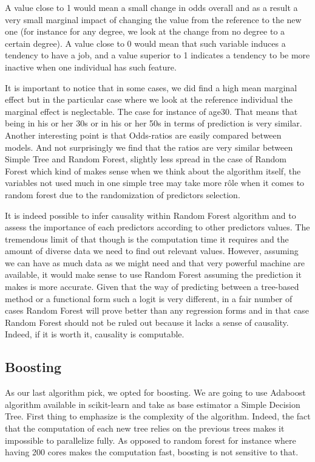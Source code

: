 
A value close to 1 would mean a small change in odds overall and as a result a very small marginal impact of changing the value from the reference to the new one (for instance for any degree, we look at the change from no degree to a certain degree). A value close to 0 would mean that such variable induces a tendency to have a job, and a value superior to 1 indicates a tendency to be more inactive when one individual has such feature.



It is important to notice that in some cases, we did find a high mean marginal effect but in the particular case where we look at the reference individual the marginal effect is neglectable. The case for instance of age30. That means that being in his or her 30s or in his or her 50s in terms of prediction is very similar.
Another interesting point is that Odds-ratios are easily compared between models. And not surprisingly we find that the ratios are very similar between Simple Tree and Random Forest, slightly less spread in the case of Random Forest which kind of makes sense when we think about the algorithm itself, the variables not used much in one simple tree may take more rôle when it comes to random forest due to the randomization of predictors selection.


It is indeed possible to infer causality within Random Forest algorithm and to assess the importance of each predictors according to other predictors values. The tremendous limit of that though is the computation time it requires and the amount of diverse data we need to find out relevant values. However, assuming we can have as much data as we might need and that very powerful machine are available, it would make sense to use Random Forest assuming the prediction it makes is more accurate. Given that the way of predicting between a tree-based method or a functional form such a logit is very different, in a fair number of cases Random Forest will prove better than any regression forms and in that case Random Forest should not be ruled out because it lacks a sense of causality. Indeed, if it is worth it, causality is computable.


\subsection{Boosting}
As our last algorithm pick, we opted for boosting. We are going to use Adaboost algorithm available in scikit-learn and take as base estimator a Simple Decision Tree.
First thing to emphasize is the complexity of the algorithm. Indeed, the fact that the computation of each new tree relies on the previous trees makes it impossible to parallelize fully. As opposed to random forest for instance where having 200 cores makes the computation fast, boosting is not sensitive to that.

